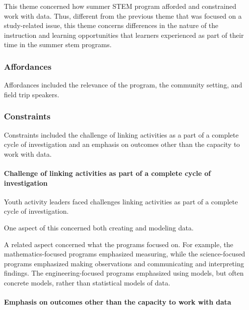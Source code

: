 \documentclass[]{msu-thesis}
\let\oldparagraph\paragraph
\renewcommand{\paragraph}[1]{\oldparagraph{#1}\mbox{}}
\theoremstyle{definition}
\theoremstyle{definition}
\theoremstyle{definition}
\theoremstyle{remark}
\begin{document}
This theme concerned how summer STEM program afforded and constrained
work with data. Thus, different from the previous theme that was focused
on a study-related issue, this theme concerns differences in the nature
of the instruction and learning opportunities that learners experienced
as part of their time in the summer stem programs.

\subsubsection{Affordances}\label{affordances}

Affordances included the relevance of the program, the community
setting, and field trip speakers.

\subsubsection{Constraints}\label{constraints}

Constraints included the challenge of linking activities as a part of a
complete cycle of investigation and an emphasis on outcomes other than
the capacity to work with data.

\paragraph{Challenge of linking activities as part of a complete cycle
of
investigation}\label{challenge-of-linking-activities-as-part-of-a-complete-cycle-of-investigation}

Youth activity leaders faced challenges linking activities as part of a
complete cycle of investigation.

One aspect of this concerned both creating and modeling data.

A related aspect concerned what the programs focused on. For example,
the mathematics-focused programs emphasized measuring, while the
science-focused programs emphasized making observations and
communicating and interpreting findings. The engineering-focused
programs emphasized using models, but often concrete models, rather than
statistical models of data.

\paragraph{Emphasis on outcomes other than the capacity to work with
data}\label{emphasis-on-outcomes-other-than-the-capacity-to-work-with-data}
\end{document}

